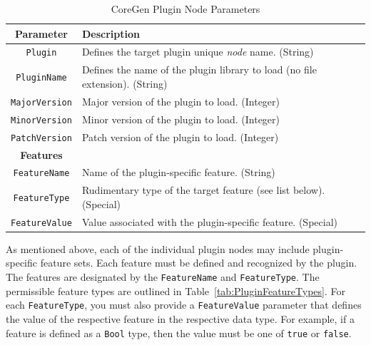 \documentclass{article}
\begin{document}
\begin{table}[h]
\begin{center}
\caption{CoreGen Plugin Node Parameters}
\vspace{0.125in}
\label{tab:PluginParams}
\begin{tabular}{|c|l|}
\hline
\textbf{Parameter} & \textbf{Description}\\
\hline
\texttt{Plugin} & Defines the target plugin unique \textit{node} name. (String)\\
\hline
\texttt{PluginName} & Defines the name of the plugin library to load (no file extension). (String)\\
\hline
\texttt{MajorVersion} & Major version of the plugin to load. (Integer)\\
\hline
\texttt{MinorVersion} & Minor version of the plugin to load. (Integer)\\
\hline
\texttt{PatchVersion} & Patch version of the plugin to load. (Integer)\\
\hline
\textbf{Features} & \\
\hline
\texttt{FeatureName} & Name of the plugin-specific feature. (String)\\
\hline
\texttt{FeatureType} & Rudimentary type of the target feature (see list below). (Special)\\
\hline
\texttt{FeatureValue} & Value associated with the plugin-specific feature. (Special)\\
\hline
\end{tabular}
\end{center}
\end{table}

As mentioned above, each of the individual plugin nodes may include plugin-specific 
feature sets.  Each feature must be defined and recognized by the plugin.  The features 
are designated by the \texttt{FeatureName} and \texttt{FeatureType}.  The permissible feature types 
are outlined in Table~\ref{tab:PluginFeatureTypes}.  For each \texttt{FeatureType}, you must also 
provide a \texttt{FeatureValue} parameter that defines the value of the respective feature in the 
respective data type.  For example, if a feature is defined as a \texttt{Bool} type, then the value 
must be one of \texttt{true} or \texttt{false}.  
\end{document}
